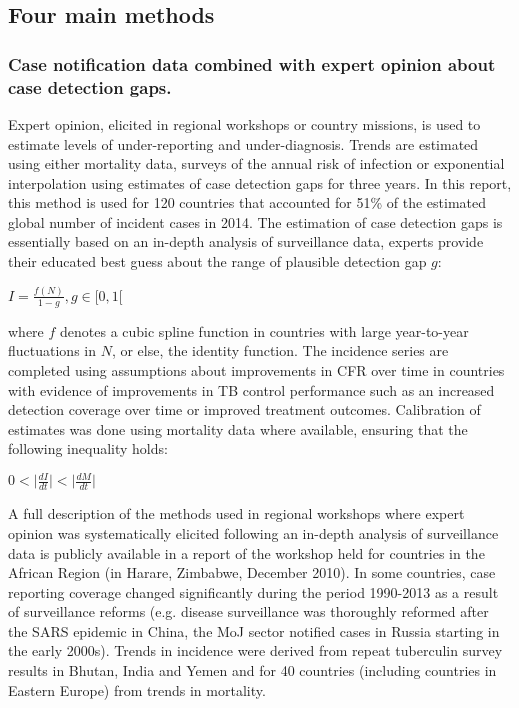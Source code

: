 \subsection {Four main methods}

\subsubsection {Case notification data combined with expert opinion about case detection gaps.} Expert opinion, elicited in regional workshops or country missions, is used to estimate levels of under-reporting and under-diagnosis. Trends are estimated using either mortality data, surveys of the annual risk of infection or exponential interpolation using estimates of case detection gaps for three years. In this report, this method is used for 120 countries that accounted for 51\% of the estimated global number of incident cases in 2014. The estimation of case detection gaps is essentially based on an in-depth analysis of surveillance data, experts provide their educated best guess about the range of plausible detection gap $g$:

$I=\frac{f(N)}{1-g}, g\in[0,1[$

where $f$ denotes a cubic spline function in countries with large year-to-year fluctuations in $N$, or else, the identity function. The incidence series are completed using assumptions about improvements in CFR over time in countries with evidence of improvements in TB control performance such as an increased detection coverage over time or improved treatment outcomes. Calibration of estimates was done using mortality data where available, ensuring that the following inequality holds: 

$0 < \lvert \frac{dI}{dt} \rvert < \lvert \frac{dM}{dt} \rvert $

A full description of the methods used in regional workshops where expert opinion was systematically elicited following an in-depth analysis of surveillance data is publicly available in a report of the workshop held for countries in the African Region (in Harare, Zimbabwe, December 2010\cite{WHO}). In some countries, case reporting coverage changed significantly during the period 1990-2013 as a result of surveillance reforms (e.g. disease surveillance was thoroughly reformed after the SARS epidemic in China, the MoJ sector notified cases in Russia starting in the early 2000s). Trends in incidence were derived from repeat tuberculin survey results in Bhutan, India and Yemen and for 40 countries (including countries in Eastern Europe) from trends in mortality. 

